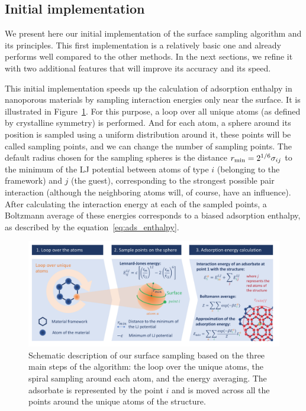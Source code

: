 \documentclass[main]{subfiles}
\begin{document}
\subsection{Initial implementation}

We present here our initial implementation of the surface sampling algorithm and its  principles. This first implementation is a relatively basic one and already performs well compared to the other methods. In the next sections, we refine it with two additional features that will improve its accuracy and its speed.

This initial implementation speeds up the calculation of adsorption enthalpy in nanoporous materials by sampling interaction energies only near the surface. It is illustrated in Figure~\ref{fgr:principle}. For this purpose, a loop over all unique atoms (as defined by crystalline symmetry) is performed. And for each atom, a sphere around its position is sampled using a uniform distribution around it, these points will be called sampling points, and we can change the number of sampling points. The default radius chosen for the sampling spheres is the distance $r_{\text{min}}=2^{1/6}\sigma_{ij}$ to the minimum of the LJ potential between atoms of type $i$ (belonging to the framework) and $j$ (the guest), corresponding to the strongest possible pair interaction (although the neighboring atoms will, of course, have an influence). After calculating the interaction energy at each of the sampled points, a Boltzmann average of these energies corresponds to a biased adsorption enthalpy, as described by the equation~\ref{eq:ads_enthalpy}.

\begin{figure}[ht]
\centering

  \includegraphics[clip, trim=0.6cm 0.74cm 0.78cm 0.6cm,width=0.95\linewidth]{figures/3-fastsim/Principe_screening.pdf}
  \caption{Schematic description of our surface sampling based on the three main steps of the algorithm: the loop over the unique atoms, the spiral sampling around each atom, and the energy averaging. The adsorbate is represented by the point $i$ and is moved across all the points around the unique atoms of the structure.}\label{fgr:principle}
\end{figure}
\end{document}
